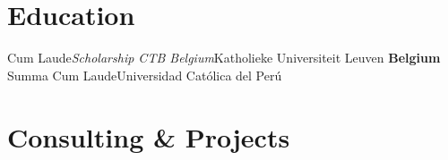 \documentclass[10pt,a4paper, sans, unicode]{moderncv} %
\begin{document}
\makecvtitle %

\justifying
\section{Education}

 {Cum Laude}{\textit{Scholarship CTB Belgium}}{Katholieke Universiteit Leuven \textbf{Belgium}}{}{}
 {Summa Cum Laude}{Universidad Católica del Perú}{}{}

\section{Consulting \& Projects}
\end{document}
